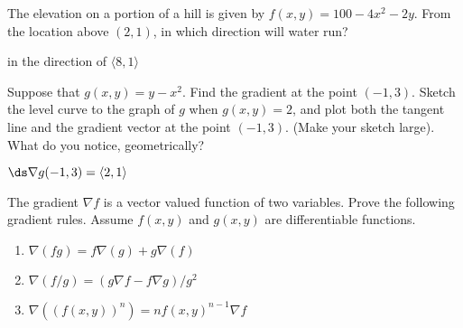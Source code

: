 \begin{enumialphparenastyle}
\begin{ex}
The elevation on a portion of a hill is given by $f(x,y) =
100 -4x^2 - 2y$.  From the location above $(2,1)$, in which direction will
water run?
\begin{sol}
in the direction of $\langle 8,1\rangle$
\end{sol}
\end{ex}

\begin{ex}
Suppose that $g(x,y)=y-x^2$.  Find the gradient at the point
$(-1, 3)$.  Sketch the level curve to the graph of $g$ when
$g(x,y)=2$, and plot both the tangent line and the gradient vector at
the point $(-1,3)$. (Make your sketch large).  What do you notice,
geometrically?
\begin{sol}
$\ds \nabla g(-1,3)=\langle 2,1\rangle$
\end{sol}
\end{ex}

\begin{ex}
The gradient $\nabla f$ is a vector
valued function of two variables.  Prove the following gradient rules.
Assume $f(x,y)$ and $g(x,y)$ are differentiable functions.

\begin{enumerate}
	\item $\nabla(fg)=f\nabla(g)+g\nabla(f)$
	\item $\nabla(f/g)=(g\nabla f - f \nabla g)/g^2$
	\item $\nabla((f(x,y))^n)=nf(x,y)^{n-1}\nabla f$
\end{enumerate}
\end{ex}

\end{enumialphparenastyle}